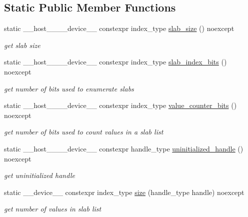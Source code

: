 \subsection*{Static Public Member Functions}
\begin{DoxyCompactItemize}
\item 
static \+\_\+\+\_\+host\+\_\+\+\_\+\+\_\+\+\_\+device\+\_\+\+\_\+ constexpr index\+\_\+type \hyperlink{classwarpcore_1_1storage_1_1multi__value_1_1StaticSlabListStore_a26df45ef6d1006a3749e2a17d2b848c7}{slab\+\_\+size} () noexcept
\begin{DoxyCompactList}\small\item\em get slab size \end{DoxyCompactList}\item 
static \+\_\+\+\_\+host\+\_\+\+\_\+\+\_\+\+\_\+device\+\_\+\+\_\+ constexpr index\+\_\+type \hyperlink{classwarpcore_1_1storage_1_1multi__value_1_1StaticSlabListStore_a6a5d21c7ea19471f5ef36e18bb2543c7}{slab\+\_\+index\+\_\+bits} () noexcept
\begin{DoxyCompactList}\small\item\em get number of bits used to enumerate slabs \end{DoxyCompactList}\item 
static \+\_\+\+\_\+host\+\_\+\+\_\+\+\_\+\+\_\+device\+\_\+\+\_\+ constexpr index\+\_\+type \hyperlink{classwarpcore_1_1storage_1_1multi__value_1_1StaticSlabListStore_a2b1e5bb9b69d35c4730f720ecc4549c9}{value\+\_\+counter\+\_\+bits} () noexcept
\begin{DoxyCompactList}\small\item\em get number of bits used to count values in a slab list \end{DoxyCompactList}\item 
static \+\_\+\+\_\+host\+\_\+\+\_\+\+\_\+\+\_\+device\+\_\+\+\_\+ constexpr handle\+\_\+type \hyperlink{classwarpcore_1_1storage_1_1multi__value_1_1StaticSlabListStore_a2af9e523c1c3655b7b7786698e02e9b5}{uninitialized\+\_\+handle} () noexcept
\begin{DoxyCompactList}\small\item\em get uninitialized handle \end{DoxyCompactList}\item 
static \+\_\+\+\_\+device\+\_\+\+\_\+ constexpr index\+\_\+type \hyperlink{classwarpcore_1_1storage_1_1multi__value_1_1StaticSlabListStore_a76bd4deb704282111c9ee03210450559}{size} (handle\+\_\+type handle) noexcept
\begin{DoxyCompactList}\small\item\em get number of values in slab list \end{DoxyCompactList}\end{DoxyCompactItemize}


